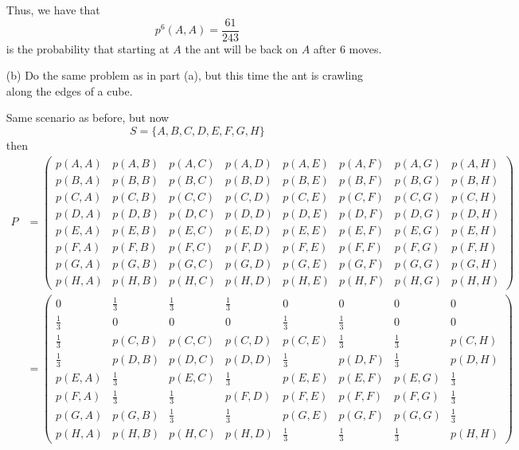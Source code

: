 \documentclass[11pt]{article}
\begin{document}
\begin{problem}
\begin{enumerate}
\begin{solution}
\[\] Thus, we have that \[\boxed{p^6(A, A) = \frac{61}{243}}\] is the probability that starting at $A$ the ant will be back on $A$ after $6$ moves.
    \end{solution}
    \item[(b)] Do the same problem as in part (a), but this time the ant is crawling along the edges of a cube.
\begin{solution}
    Same scenario as before, but now 
    \[S = \{A, B, C, D, E, F, G, H\}\] then 
    \begin{align*}
        P &= \begin{pmatrix}
p(A, A) & p(A, B) & p(A, C) & p(A, D) & p(A, E) & p(A, F) & p(A, G) & p(A, H)\\
p(B, A) & p(B, B) & p(B, C) & p(B, D) & p(B, E) & p(B, F) & p(B, G) & p(B, H)\\
p(C, A) & p(C, B) & p(C, C) & p(C, D) & p(C, E) & p(C, F) & p(C, G) & p(C, H)\\
p(D, A) & p(D, B) & p(D, C) & p(D, D) & p(D, E) & p(D, F) & p(D, G) & p(D, H)\\
p(E, A) & p(E, B) & p(E, C) & p(E, D) & p(E, E) & p(E, F) & p(E, G) & p(E, H)\\
p(F, A) & p(F, B) & p(F, C) & p(F, D) & p(F, E) & p(F, F) & p(F, G) & p(F, H)\\
p(G, A) & p(G, B) & p(G, C) & p(G, D) & p(G, E) & p(G, F) & p(G, G) & p(G, H)\\
p(H, A) & p(H, B) & p(H, C) & p(H, D) & p(H, E) & p(H, F) & p(H, G) & p(H, H)
\end{pmatrix}\\
&= \begin{pmatrix}
0 & \frac{1}{3} & \frac{1}{3} & \frac{1}{3} & 0 & 0 & 0 & 0\\
\frac{1}{3} & 0 & 0 & 0 & \frac{1}{3} & \frac{1}{3} & 0 & 0\\
\frac{1}{3} & p(C, B) & p(C, C) & p(C, D) & p(C, E) & \frac{1}{3} & \frac{1}{3} & p(C, H)\\
\frac{1}{3} & p(D, B) & p(D, C) & p(D, D) & \frac{1}{3} & p(D, F) & \frac{1}{3} & p(D, H)\\
p(E, A) & \frac{1}{3} & p(E, C) & \frac{1}{3} & p(E, E) & p(E, F) & p(E, G) & \frac{1}{3}\\
p(F, A) & \frac{1}{3} & \frac{1}{3} & p(F, D) & p(F, E) & p(F, F) & p(F, G) & \frac{1}{3}\\
p(G, A) & p(G, B) & \frac{1}{3} & \frac{1}{3} & p(G, E) & p(G, F) & p(G, G) & \frac{1}{3}\\
p(H, A) & p(H, B) & p(H, C) & p(H, D) & \frac{1}{3} & \frac{1}{3} & \frac{1}{3} & p(H, H)

\end{pmatrix}
\end{align*}
\end{solution}
\end{enumerate}
\end{problem}
\end{document}
